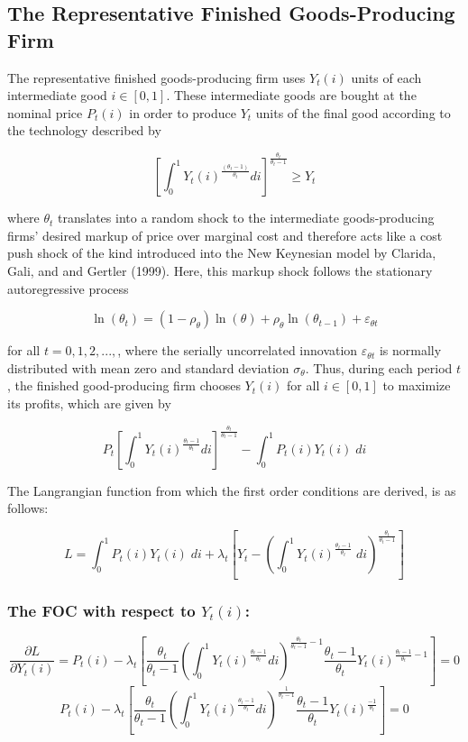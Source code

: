 \documentclass[11pt,preprint, authoryear]{elsarticle}
\numberwithin{equation}{section}
\numberwithin{figure}{section}
\numberwithin{table}{section}
\begin{document}
\hypertarget{the-representative-finished-goods-producing-firm}{%
\subsection{The Representative Finished Goods-Producing
Firm}\label{the-representative-finished-goods-producing-firm}}

The representative finished goods-producing firm uses \(Y_t(i)\) units
of each intermediate good \(i \in [0,1]\). These intermediate goods are
bought at the nominal price \(P_t(i)\) in order to produce \(Y_t\) units
of the final good according to the technology described by

\[[\int_0^1Y_t(i)^{\frac{(\theta_t-1)}{\theta_t}} di]^{\frac{\theta_t}{\theta_t-1}} \ge Y_t\]

where \(\theta_t\) translates into a random shock to the intermediate
goods-producing firms' desired markup of price over marginal cost and
therefore acts like a cost push shock of the kind introduced into the
New Keynesian model by Clarida, Gali, and and Gertler (1999). Here, this
markup shock follows the stationary autoregressive process

\[\ln(\theta_t)=(1-\rho_{\theta})\ln(\theta)+\rho_{\theta}\ln(\theta_{t-1})+\varepsilon_{\theta t} \tag{10}\]

for all \(t=0,1,2,...,\), where the serially uncorrelated innovation
\(\varepsilon_{\theta t}\) is normally distributed with mean zero and
standard deviation \(\sigma_{\theta}\). Thus, during each period \(t\),
the finished good-producing firm chooses \(Y_t(i)\) for all
\(i \in [0,1]\) to maximize its profits, which are given by

\[P_t[\int_0^1Y_t(i)^{\frac{\theta_t-1}{\theta_t}} di]^{\frac{\theta_t}{\theta_t-1}} - \int_0^1P_t(i)Y_t(i) \;di\]

The Langrangian function from which the first order conditions are
derived, is as follows:

\[L = \int_0^1P_t(i)Y_t(i) \; di +\lambda_t[Y_t - (\int_0^1Y_t(i)^{\frac{\theta_t-1}{\theta_t}} \;di)^{\frac{\theta_t}{\theta_t-1}}]\]

\hypertarget{the-foc-with-respect-to-y_ti}{%
\subsubsection{\texorpdfstring{The FOC with respect to
\(Y_t(i)\):}{The FOC with respect to Y\_t(i):}}\label{the-foc-with-respect-to-y_ti}}

\[\frac{\partial L}{\partial Y_t(i)} = P_t(i) - \lambda_t[{\frac{\theta_t}{\theta_t-1}} (\int_0^1 Y_t(i)^{\frac{\theta_t-1}{\theta_t}} di)^{\frac{\theta_t}{\theta_t-1} -1} \frac{\theta_t-1}{\theta_t} Y_t(i)^{\frac{\theta_t-1}{\theta_t} -1}] = 0\]
\[P_t(i) - \lambda_t[{\frac{\theta_t}{\theta_t-1}} (\int_0^1 Y_t(i)^{\frac{\theta_t-1}{\theta_t}} di)^{\frac{1}{\theta_t-1}} \frac{\theta_t-1}{\theta_t} Y_t(i)^{\frac{-1}{\theta_t}}] = 0\]
\end{document}
